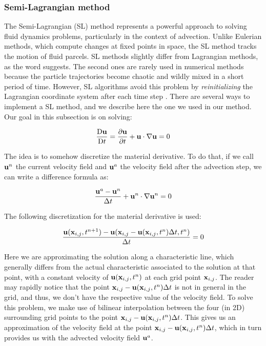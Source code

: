 \subsubsection*{Semi-Lagrangian method}
The Semi-Lagrangian (SL) method represents a powerful approach to solving fluid dynamics problems, particularly in the context of advection. Unlike Eulerian methods, which compute changes at fixed points in space, the SL method tracks the motion of fluid parcels. SL methods slightly differ from Lagrangian methods, as the word suggests. The second ones are rarely used in numerical methods because the particle trajectories become chaotic and wildly mixed in a short period of time. However, SL algorithms avoid this problem by \textit{reinitializing} the Lagrangian coordinate system after each time step \cite{Boyd2001ChebyshevFourier}. There are several ways to implement a SL method, and we describe here the one we used in our method. Our goal in this subsection is on solving:

\begin{equation*}
  \frac{\mathrm{D}\boldsymbol{\mathrm{u}}}{\mathrm{D}t} = \pdv{\boldsymbol{\mathrm{u}}}{t} + \boldsymbol{\mathrm{u}} \cdot \nabla \boldsymbol{\mathrm{u}} = 0
\end{equation*}

The idea is to somehow discretize the material derivative. To do that, if we call $\boldsymbol{\mathrm{u}}^n$ the current velocity field and $\boldsymbol{\mathrm{u}}^a$ the velocity field after the advection step, we can write a difference formula as:

\begin{equation*}
  \frac{\boldsymbol{\mathrm{u}}^a- \boldsymbol{\mathrm{u}}^n}{\Delta t} + \boldsymbol{\mathrm{u}}^n \cdot \nabla \boldsymbol{\mathrm{u}}^n = 0
\end{equation*}

The following discretization for the material derivative is used:

\begin{equation*}
  \frac{\boldsymbol{\mathrm{u}}(\boldsymbol{\mathrm{x}}_{i,j},t^{n+1})  - \boldsymbol{\mathrm{u}}(\boldsymbol{\mathrm{x}}_{i,j} - \boldsymbol{\mathrm{u}}(\boldsymbol{\mathrm{x}}_{i,j},t^n)\Delta t,t^n)}{\Delta t} = 0
\end{equation*}

Here we are approximating the solution along a characteristic line, which generally differs from the actual characteristic associated to the solution at that point, with a constant velocity of $\boldsymbol{\mathrm{u}}(\boldsymbol{\mathrm{x}}_{i,j},t^n)$ at each grid point $\boldsymbol{\mathrm{x}}_{i,j}$.
The reader may rapidly notice that the point $\boldsymbol{\mathrm{x}}_{i,j} - \boldsymbol{\mathrm{u}}(\boldsymbol{\mathrm{x}}_{i,j},t^n)\Delta t$ is not in general in the grid, and thus, we don't have the respective value of the velocity field. To solve this problem, we make use of bilinear interpolation between the four (in 2D) surrounding grid points to the point $\boldsymbol{\mathrm{x}}_{i,j} - \boldsymbol{\mathrm{u}}(\boldsymbol{\mathrm{x}}_{i,j},t^n)\Delta t$. This gives us an approximation of the velocity field at the point $\boldsymbol{\mathrm{x}}_{i,j} - \boldsymbol{\mathrm{u}}(\boldsymbol{\mathrm{x}}_{i,j},t^n)\Delta t$, which in turn provides us with the advected velocity field $\boldsymbol{\mathrm{u}}^a$.


